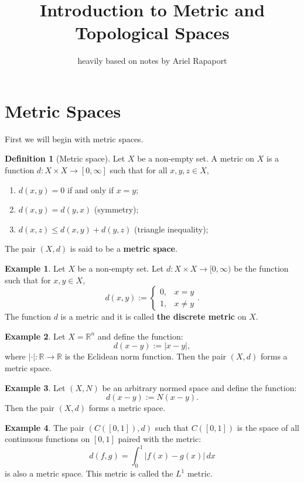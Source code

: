 \documentclass[11pt,a4paper]{article}
\title{\textbf{Introduction to Metric and Topological Spaces}}
\author{heavily based on notes by Ariel Rapaport}
\date{}
\theoremstyle{definition}
\newtheorem{definition}{Definition}[section]
\newtheorem{example}{Example}[section]
\theoremstyle{plain}
\newcommand{\R}{\mathbb{R}}
\newcommand{\abs}[1]{\left\lvert #1\right\rvert}
\begin{document}
  \maketitle
  \newpage
  \section{Metric Spaces}\label{sec:metric-spaces}
  First we will begin with metric spaces.
  \begin{definition}[Metric space]
  Let $X$ be a non-empty set. A metric on $X$ is a function 
  $d \colon X \times X \to [0,\infty]$ such that for all $x,y,z \in X$,
  \end{definition}
  \begin{enumerate}
    \item[(1)] $d(x,y) = 0$ if and only if $x = y$;
    \item[(2)] $d(x,y) = d(y,x)$ (symmetry);
    \item[(3)] $d(x,z) \le d(x,y) + d(y,z)$ (triangle inequality);
  \end{enumerate}
  The pair $(X,d)$ is said to be a \textbf{metric space}.
  \begin{example}
  Let $X$ be a non-empty set. Let $d \colon X \times X \to [0,\infty)$ be
  the function such that for $x,y \in X$,
  \[
    d(x,y) := \begin{cases}
      0, & x=y \\
      1, & x \neq y
    \end{cases}.
  \]
  The function $d$ is a metric and it is called \textbf{the discrete metric}
  on $X$.
  \end{example}
  \begin{example}
  Let $X = \R^n$ and define the function:
  \[
    d(x - y) := \abs{x - y},
  \]
  where $\abs{\cdot} \colon \R \to \R$ is the Eclidean norm function. 
  Then the pair $(X, d)$ forms a metric space.
  \end{example}
  \begin{example}
  Let $(X, N)$ be an arbitrary normed space and define the function:
  \[
    d(x - y) := N(x - y).
  \] 
  Then the pair $(X, d)$ forms a metric space.
  \end{example}
  \begin{example}
  The pair $(C\left([0,1]\right), d)$ such that $C([0,1])$ is the space of 
  all continuous functions on $[0,1]$ paired with the metric:
  \[
    d(f,g) = \int_{0}^{1}{\abs{f(x) - g(x)}\,dx}
  \]
  is also a metric space. This metric is called the $L^1$ metric.
  \end{example}
  
\end{document}
